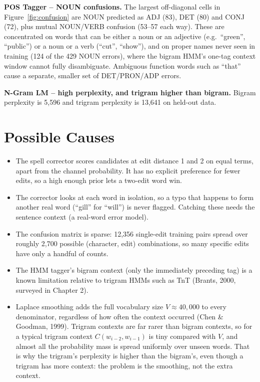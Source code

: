 \documentclass[12pt,a4paper]{report}
\begin{document}
\textbf{POS Tagger -- NOUN confusions.} The largest off-diagonal cells
in Figure~\ref{fig:confusion} are NOUN predicted as ADJ (83), DET (80)
and CONJ (72), plus mutual NOUN/VERB confusion (53--57 each way). These
are concentrated on words that can be either a noun or an adjective
(e.g.\ ``green'', ``public'') or a noun or a verb (``cut'', ``show''),
and on proper names never seen in training (124 of the 429 NOUN
errors), where the bigram HMM's one-tag context window cannot fully
disambiguate. Ambiguous function words such as ``that'' cause a
separate, smaller set of DET/PRON/ADP errors.

\textbf{N-Gram LM -- high perplexity, and trigram higher than bigram.}
Bigram perplexity is 5,596 and trigram perplexity is 13,641 on held-out
data.

\section{Possible Causes}

\begin{itemize}
    \item The spell corrector scores candidates at edit distance 1 and 2
    on equal terms, apart from the channel probability. It has no
    explicit preference for fewer edits, so a high enough prior lets a
    two-edit word win.
    \item The corrector looks at each word in isolation, so a typo that
    happens to form another real word (``gill'' for ``will'') is never
    flagged. Catching these needs the sentence context (a real-word
    error model).
    \item The confusion matrix is sparse: 12,356 single-edit training
    pairs spread over roughly 2,700 possible (character, edit)
    combinations, so many specific edits have only a handful of counts.
    \item The HMM tagger's bigram context (only the immediately preceding
    tag) is a known limitation relative to trigram HMMs such as TnT
    (Brants, 2000, surveyed in Chapter 2).
    \item \label{sec:smoothing-limitation} Laplace smoothing adds the
    full vocabulary size $V \approx 40{,}000$ to every denominator,
    regardless of how often the context occurred (Chen \& Goodman, 1999).
    Trigram contexts are far rarer than bigram contexts, so for a
    typical trigram context $C(w_{i-2}, w_{i-1})$ is tiny compared with
    $V$, and almost all the probability mass is spread uniformly over
    unseen words. That is why the trigram's perplexity is higher than
    the bigram's, even though a trigram has more context: the problem
    is the smoothing, not the extra context.
\end{itemize}
\end{document}
